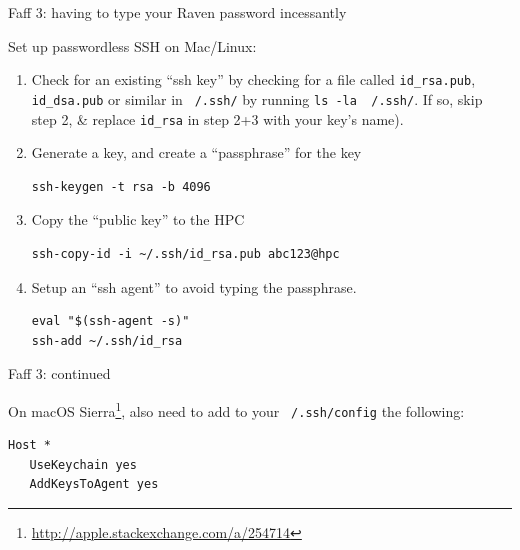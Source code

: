 \documentclass[t,10pt]{beamer}
\let\oldfootnote\footnote
\renewcommand\footnote[1][]{\oldfootnote[frame,#1]}
\begin{document}
\begin{frame}[fragile]{Faff 3: having to type your Raven password incessantly}

Set up \alert{passwordless SSH} on Mac/Linux:
\begin{enumerate}
\item Check for an existing ``ssh key'' by checking for a file called \texttt{id_rsa.pub}, \texttt{id_dsa.pub} or similar in \texttt{~/.ssh/} by running \texttt{ls -la ~/.ssh/}. If so, skip step 2, \& replace \texttt{id_rsa} in step 2+3 with your key's name).

\item Generate a key, and create a ``passphrase'' for the key
\begin{verbatim}
ssh-keygen -t rsa -b 4096
\end{verbatim}

\item Copy the ``public key'' to the HPC
\begin{verbatim}
ssh-copy-id -i ~/.ssh/id_rsa.pub abc123@hpc
\end{verbatim}

\item Setup an ``ssh agent'' to avoid typing the passphrase.
\begin{verbatim}
eval "$(ssh-agent -s)"
ssh-add ~/.ssh/id_rsa
\end{verbatim}
\end{enumerate}

\end{frame}

\begin{frame}[fragile]{Faff 3: continued}

On macOS Sierra\footnote{\url{http://apple.stackexchange.com/a/254714}}, also need to add to your \texttt{~/.ssh/config} the following:

\begin{verbatim}
Host *
   UseKeychain yes
   AddKeysToAgent yes
\end{verbatim}

\end{frame}
\end{document}

